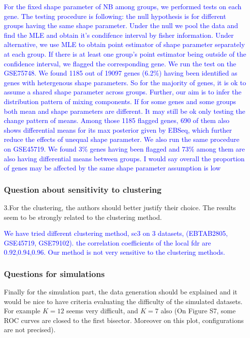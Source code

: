 \documentclass[]{article}
\begin{document}
\textcolor{blue}{For the fixed shape parameter of NB among groups, we performed tests on each gene.
The testing procedure is following: the null hypothesis is for different groups having the same shape parameter. Under the null we pool the data and find the MLE and obtain it's condifence interval by fisher information. Under alternative, we use MLE to obtain point estimator of shape parameter separately at each group. If there is at least one group's point estimator being outside of the confidence interval, we flagged the corresponding gene. We run the test on the GSE75748. We found 1185 out of 19097 genes (6.2\%) having been identified as genes with hetergenous shape parameters. 
So for the majority of genes, it is ok to assume a shared shape parameter across groups.
Further, our aim is to infer the distribution pattern of mixing components. If for some genes and some groups both mean and shape parameters are different. It may still be ok only testing the change pattern of means. Among those 1185 flagged genes, 690 of them also shows differential means for its max posterior given by EBSeq, which further reduce the effects of unequal shape parameter.
We also run the same procedure on GSE45719. We found 3\% genes having been flagged and 73\% among them are also having differential means between groups. I would say overall the proportion of genes may be affected by the same shape parameter assumption is low 
}

\subsubsection{Question about sensitivity to
clustering}\label{question-about-sensitivity-to-clustering}

3.For the clustering, the authors should better justify their choice.
The results seem to be strongly related to the clustering method.

\textcolor{blue}{We have tried different clustering method, sc3 on 3 datasets, (EBTAB2805, GSE45719, GSE79102). 
the correlation coefficients of the local fdr are 0.92,0.94,0.96. Our method is not very sensitive to the clustering methods.}

\subsubsection{Questions for
simulations}\label{questions-for-simulations}

Finally for the simulation part, the data generation should be explained
and it would be nice to have criteria evaluating the difficulty of the
simulated datasets. For example \(K=12\) seems very difficult, and
\(K=7\) also (On Figure S7, some ROC curves are closed to the first
bisector. Moreover on this plot, configurations are not precised).
\end{document}

